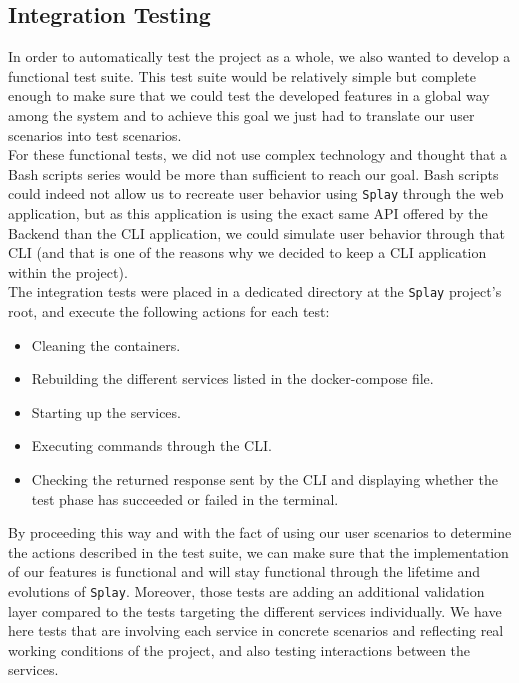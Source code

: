 \documentclass{eplmastersthesis}
\begin{document}
      \subsection{Integration Testing}

        In order to automatically test the project as a whole, we also wanted to
        develop a functional test suite. This test suite would be relatively
        simple but complete enough to make sure that we could test the developed
        features in a global way among the system and to achieve this goal we
        just had to translate our user scenarios into test scenarios.\\

        For these functional tests, we did not use complex technology and
        thought that a Bash scripts series would be more than sufficient to
        reach our goal. Bash scripts could indeed not allow us to recreate user
        behavior using \texttt{Splay} through the web application, but as this
        application is using the exact same API offered by the Backend than the
        CLI application, we could simulate user behavior through that CLI (and
        that is one of the reasons why we decided to keep a CLI application
        within the project).\\

        The integration tests were placed in a dedicated directory at the \texttt{Splay}
        project's root, and execute the following actions for each test:

        \begin{itemize}
          \item Cleaning the containers.
          \item Rebuilding the different services listed in the docker-compose
          file.
          \item Starting up the services.
          \item Executing commands through the CLI.
          \item Checking the returned response sent by the CLI and displaying
          whether the test phase has succeeded or failed in the terminal.
        \end{itemize}

        By proceeding this way and with the fact of using our user scenarios to
        determine the actions described in the test suite, we can make sure
        that the implementation of our features is functional and will stay
        functional through the lifetime and evolutions of \texttt{Splay}. Moreover, those
        tests are adding an additional validation layer compared to the tests
        targeting the different services individually. We have here tests that
        are involving each service in concrete scenarios and reflecting real
        working conditions of the project, and also testing interactions
        between the services.
\end{document}
